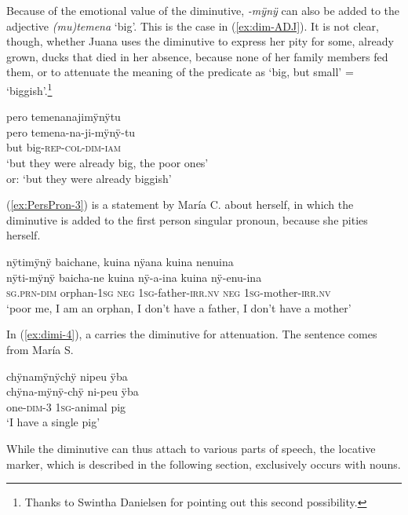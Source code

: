 Because of the emotional value of the diminutive, \textit{-mÿnÿ} can also be added to the adjective \textit{(mu)temena} ‘big’. This is the case in (\ref{ex:dim-ADJ}). It is not clear, though, whether Juana uses the diminutive to express her pity for some, already grown, ducks that died in her absence, because none of her family members fed them, or to attenuate the meaning of the predicate as ‘big, but small’ = ‘biggish’.\footnote{Thanks to Swintha Danielsen for pointing out this second possibility.}


\ea\label{ex:dim-ADJ}
\begingl 
\glpreamble pero temenanajimÿnÿtu\\
\gla pero temena-na-ji-mÿnÿ-tu\\ 
\glb but big-\textsc{rep}-\textsc{col}-\textsc{dim}-\textsc{iam}\\ 
\glft ‘but they were already big, the poor ones’\\or: ‘but they were already biggish’\\ 
\endgl
{}
\xe
{}

(\ref{ex:PersPron-3}) is a statement by María C. about herself, in which the diminutive is added to the first person singular pronoun, because she pities herself.

\ea\label{ex:PersPron-3}
\begingl
\glpreamble nÿtimÿnÿ baichane, kuina nÿana kuina nenuina\\
\gla nÿti-mÿnÿ baicha-ne kuina nÿ-a-ina kuina nÿ-enu-ina\\
\textsc{sg.prn}-\textsc{dim} orphan-1\textsc{sg} \textsc{neg} 1\textsc{sg}-father-\textsc{irr.nv} \textsc{neg} 1\textsc{sg}-mother-\textsc{irr.nv}\\
\glft ‘poor me, I am an orphan, I don’t have a father, I don’t have a mother’
\endgl
\trailingcitation{[uxx-p110825l.071]}
\xe

In (\ref{ex:dimi-4}), a  carries the diminutive for attenuation. The sentence comes from María S.

\ea\label{ex:dimi-4}
\begingl
\glpreamble chÿnamÿnÿchÿ nipeu ÿba\\
\gla chÿna-mÿnÿ-chÿ ni-peu ÿba\\
\glb one-\textsc{dim}-3 1\textsc{sg}-animal pig\\
\glft ‘I have a single pig’
\endgl
\trailingcitation{[rxx-e181024l.059]}
\xe



While the diminutive can thus attach to various parts of speech, the locative marker, which is described in the following section, exclusively occurs with nouns.


